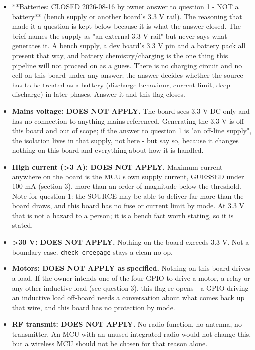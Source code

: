 \documentclass[11pt,a4paper]{article}
\begin{document}
\begin{itemize}
\item {*}{*}Batteries: CLOSED 2026-08-16 by owner answer to question 1 - NOT a
battery{*}{*} (bench supply or another board's 3.3 V rail). The reasoning that
made it a question is kept below because it is what the answer closed.
The brief names the
supply as "an external 3.3 V rail" but never says what generates it. A
bench supply, a dev board's 3.3 V pin and a battery pack all present that
way, and battery chemistry/charging is the one thing this pipeline will not
proceed on as a guess. There is no charging circuit and no cell on this
board under any answer; the answer decides whether the source has to be
treated as a battery (discharge behaviour, current limit, deep-discharge)
in later phases. Answer it and this flag closes.
\item \textbf{Mains voltage: DOES NOT APPLY.} The board sees 3.3 V DC only and has no
connection to anything mains-referenced. Generating the 3.3 V is off this
board and out of scope; if the answer to question 1 is "an off-line
supply", the isolation lives in that supply, not here - but say so, because
it changes nothing on this board and everything about how it is handled.
\item \textbf{High current (\textgreater{}3 A): DOES NOT APPLY.} Maximum current anywhere on the
board is the MCU's own supply current, GUESSED under 100 mA (section 3),
more than an order of magnitude below the threshold. Note for question 1:
the SOURCE may be able to deliver far more than the board draws, and this
board has no fuse or current limit by mode. At 3.3 V that is not a hazard
to a person; it is a bench fact worth stating, so it is stated.
\item \textbf{\textgreater{}30 V: DOES NOT APPLY.} Nothing on the board exceeds 3.3 V. Not a
boundary case. \texttt{check\_creepage} stays a clean no-op.
\item \textbf{Motors: DOES NOT APPLY as specified.} Nothing on this board drives a
load. If the owner intends one of the four GPIO to drive a motor, a relay
or any other inductive load (see question 3), this flag re-opens - a GPIO
driving an inductive load off-board needs a conversation about what comes
back up that wire, and this board has no protection by mode.
\item \textbf{RF transmit: DOES NOT APPLY.} No radio function, no antenna, no
transmitter. An MCU with an unused integrated radio would not change this,
but a wireless MCU should not be chosen for that reason alone.
\end{itemize}
\end{document}
